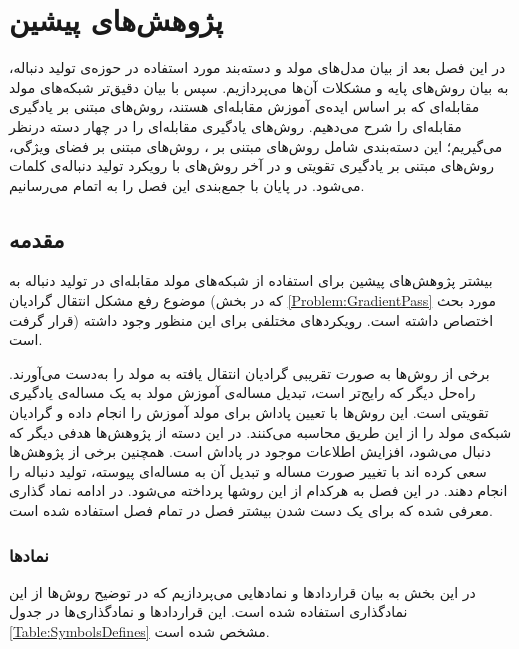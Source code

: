 \chapter{پژوهش‌های پیشین}\label{Chap:Chap2}
\minitoc
در این فصل بعد از بیان‌ مدل‌های مولد و دسته‌بند مورد استفاده در حوزه‌ی تولید دنباله، به بیان روش‌های پایه و مشکلات آن‌ها می‌پردازیم. سپس با بیان دقیق‌تر شبکه‌های مولد مقابله‌ای که بر اساس ایده‌ی آموزش مقابله‌ای هستند، روش‌های مبتنی بر یادگیری مقابله‌ای‌ را شرح می‌دهیم. روش‌های یادگیری مقابله‌ای را در چهار دسته درنظر می‌گیریم؛ این دسته‌بندی شامل روش‌های مبتنی بر
،
روش‌های مبتنی بر فضای ویژگی، روش‌های مبتنی بر یادگیری تقویتی و در آخر روش‌های با رویکرد تولید دنباله‌ی کلمات می‌شود. در پایان با جمع‌بندی این فصل را به اتمام می‌رسانیم.
\section{مقدمه}
بیشتر پژوهش‌های پیشین برای استفاده از شبکه‌های مولد مقابله‌ای در تولید دنباله به موضوع رفع مشکل انتقال گرادیان (که در بخش
\ref{Problem:GradientPass}
مورد بحث قرار گرفت) اختصاص داشته است. رویکرد‌های مختلفی برای این منظور وجود داشته است. 

برخی از روش‌ها به صورت تقریبی گرادیان انتقال یافته به مولد را به‌دست می‌آورند.
راه‌حل دیگر که رایج‌تر است، تبدیل مساله‌ی آموزش مولد به یک مساله‌ی یادگیری تقویتی است. این روش‌ها با تعیین پاداش برای مولد آموزش را انجام داده و گرادیان شبکه‌ی مولد را از این طریق محاسبه می‌کنند. در این دسته از پژوهش‌ها هدفی دیگر که دنبال می‌شود، افزایش اطلاعات موجود در پاداش  است. همچنین برخی از پژوهش‌ها سعی کرده اند با تغییر صورت مساله و تبدیل آن به مساله‌ای پیوسته، تولید دنباله را انجام دهند. در این فصل به هرکدام از این روشها پرداخته می‌شود.
در ادامه نماد گذاری معرفی شده که برای یک دست شدن بیشتر فصل در تمام فصل استفاده شده است.

 \subsection{نمادها }
در این بخش به بیان قرارداد‌ها و نماد‌هایی می‌پردازیم که در توضیح روش‌ها از این نمادگذاری استفاده شده است. این قراردادها و نمادگذاری‌ها در جدول
\ref{Table:SymbolsDefines}
مشخص شده است.

